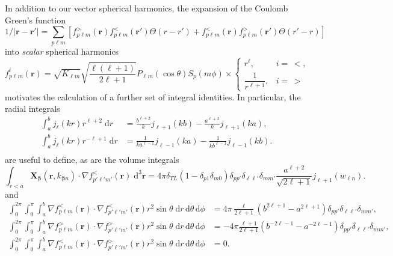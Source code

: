 In addition to our vector spherical harmonics, the expansion of the Coulomb Green's function
\begin{equation}
1/|\mathbf{r} - \mathbf{r}'| = \sum_{p\ell m}[f_{p\ell m}^>(\mathbf{r})f_{p\ell m}^<(\mathbf{r}')\Theta(r - r') + f_{p\ell m}^<(\mathbf{r})f_{p\ell m}^>(\mathbf{r}')\Theta(r' - r)]
\end{equation}
into \textit{scalar} spherical harmonics
\begin{equation}\label{eq:scalarHarmonics}
f_{p\ell m}^i(\mathbf{r}) = \sqrt{K_{\ell m}}\sqrt{\frac{\ell(\ell + 1)}{2\ell + 1}}P_{\ell m}(\cos\theta)S_p(m\phi)\times
\begin{cases}
r^\ell, & i = \, <,\\
\dfrac{1}{r^{\ell + 1}}, & i = \,>
\end{cases}
\end{equation}
motivates the calculation of a further set of integral identities. In particular, the radial integrals
\begin{equation}
\begin{split}
\int_a^b j_\ell(kr)r^{\ell+2}\;\mathrm{d}r &= \frac{b^{\ell + 2}}{k}j_{\ell + 1}(kb) - \frac{a^{\ell + 2}}{k}j_{\ell + 1}(ka),\\
\int_a^b j_\ell(kr)r^{-\ell + 1}\;\mathrm{d}r &=  \frac{1}{ka^{\ell - 1}}j_{\ell - 1}(ka) - \frac{1}{kb^{\ell -1}}j_{\ell - 1}(kb).\\
\end{split}
\end{equation}
are useful to define, as are the volume integrals
\begin{equation}
\int_{r<a}\mathbf{X}_{\bm{\beta}}(\mathbf{r},k_{\bm{\beta}n})\cdot\nabla f_{p'\ell'm'}^<(\mathbf{r})\;\mathrm{d}^3\mathbf{r} = 4\pi\delta_{TL}(1 - \delta_{p1}\delta_{m0})\delta_{pp'}\delta_{\ell\ell'}\delta_{mm'}\frac{a^{\ell + 2}}{\sqrt{2\ell + 1}}j_{\ell + 1}(w_{\ell n}).
\end{equation}
and
\begin{equation}\label{eq:laplacianHarmonicOrthogonality}
\begin{split}
\int_0^{2\pi}\int_0^\pi\int_a^b\nabla f_{p\ell m}^<(\mathbf{r})\cdot\nabla f_{p'\ell'm'}^<(\mathbf{r})r^2\sin\theta\;\mathrm{d}r\,\mathrm{d}\theta\,\mathrm{d}\phi &= 4\pi\frac{\ell}{2\ell + 1}\left(b^{2\ell + 1} - a^{2\ell + 1}\right)\delta_{pp'}\delta_{\ell\ell'}\delta_{mm'},\\
\int_0^{2\pi}\int_0^\pi\int_a^b\nabla f_{p\ell m}^>(\mathbf{r})\cdot\nabla f_{p'\ell'm'}^>(\mathbf{r})r^2\sin\theta\;\mathrm{d}r\,\mathrm{d}\theta\,\mathrm{d}\phi &= -4\pi\frac{\ell + 1}{2\ell + 1}\left(b^{-2\ell - 1} - a^{-2\ell - 1}\right)\delta_{pp'}\delta_{\ell\ell'}\delta_{mm'},\\
\int_0^{2\pi}\int_0^\pi\int_a^b\nabla f_{p\ell m}^<(\mathbf{r})\cdot\nabla f_{p'\ell'm'}^>(\mathbf{r})r^2\sin\theta\;\mathrm{d}r\,\mathrm{d}\theta\,\mathrm{d}\phi &= 0.
\end{split}
\end{equation}










